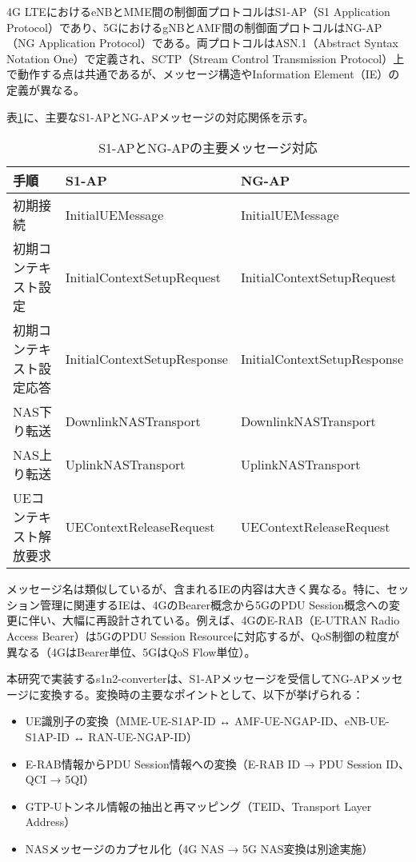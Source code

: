 4G LTEにおけるeNBとMME間の制御面プロトコルはS1-AP（S1 Application Protocol）であり、5GにおけるgNBとAMF間の制御面プロトコルはNG-AP（NG Application Protocol）である。両プロトコルはASN.1（Abstract Syntax Notation One）で定義され、SCTP（Stream Control Transmission Protocol）上で動作する点は共通であるが、メッセージ構造やInformation Element（IE）の定義が異なる。

表\ref{tab:s1ap_ngap_mapping}に、主要なS1-APとNG-APメッセージの対応関係を示す。

\begin{table}[htbp]
\centering
\caption{S1-APとNG-APの主要メッセージ対応}
\label{tab:s1ap_ngap_mapping}
\begin{tabular}{|l|l|l|}
\hline
\textbf{手順} & \textbf{S1-AP} & \textbf{NG-AP} \\
\hline
初期接続 & InitialUEMessage & InitialUEMessage \\
\hline
初期コンテキスト設定 & InitialContextSetupRequest & InitialContextSetupRequest \\
\hline
初期コンテキスト設定応答 & InitialContextSetupResponse & InitialContextSetupResponse \\
\hline
NAS下り転送 & DownlinkNASTransport & DownlinkNASTransport \\
\hline
NAS上り転送 & UplinkNASTransport & UplinkNASTransport \\
\hline
UEコンテキスト解放要求 & UEContextReleaseRequest & UEContextReleaseRequest \\
\hline
\end{tabular}
\end{table}

メッセージ名は類似しているが、含まれるIEの内容は大きく異なる。特に、セッション管理に関連するIEは、4GのBearer概念から5GのPDU Session概念への変更に伴い、大幅に再設計されている。例えば、4GのE-RAB（E-UTRAN Radio Access Bearer）は5GのPDU Session Resourceに対応するが、QoS制御の粒度が異なる（4GはBearer単位、5GはQoS Flow単位）。

本研究で実装するs1n2-converterは、S1-APメッセージを受信してNG-APメッセージに変換する。変換時の主要なポイントとして、以下が挙げられる：

\begin{itemize}
\item UE識別子の変換（MME-UE-S1AP-ID ↔ AMF-UE-NGAP-ID、eNB-UE-S1AP-ID ↔ RAN-UE-NGAP-ID）
\item E-RAB情報からPDU Session情報への変換（E-RAB ID → PDU Session ID、QCI → 5QI）
\item GTP-Uトンネル情報の抽出と再マッピング（TEID、Transport Layer Address）
\item NASメッセージのカプセル化（4G NAS → 5G NAS変換は別途実施）
\end{itemize}

